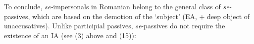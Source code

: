 \documentclass[output=paper]{langsci/langscibook}
\begin{document}
  To conclude, \textit{se-}impersonals in Romanian belong to the general class of \textit{se-}passives, which are based on the demotion of the ‘subject’ (EA, + deep object of unaccusatives). Unlike participial passives, \textit{se}{}-passives do not require the existence of an IA (see (3) above and (15)):
% 
% 
% 
% 
% 
% 
% 
% 
% 
% 
% 
% 
% 
% 
% 
% 
% 
% 
\end{document}
